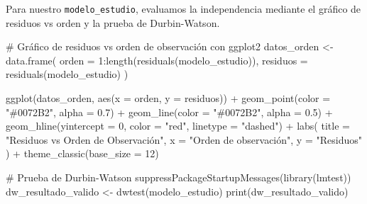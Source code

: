 \documentclass[
  letterpaper,
  DIV=11,
  numbers=noendperiod]{scrreprt}
\newenvironment{Shaded}{\begin{snugshade}}{\end{snugshade}}
\newcommand{\AttributeTok}[1]{\textcolor[rgb]{0.40,0.45,0.13}{#1}}
\newcommand{\CommentTok}[1]{\textcolor[rgb]{0.37,0.37,0.37}{#1}}
\newcommand{\DecValTok}[1]{\textcolor[rgb]{0.68,0.00,0.00}{#1}}
\newcommand{\FloatTok}[1]{\textcolor[rgb]{0.68,0.00,0.00}{#1}}
\newcommand{\FunctionTok}[1]{\textcolor[rgb]{0.28,0.35,0.67}{#1}}
\newcommand{\NormalTok}[1]{\textcolor[rgb]{0.00,0.23,0.31}{#1}}
\newcommand{\OtherTok}[1]{\textcolor[rgb]{0.00,0.23,0.31}{#1}}
\newcommand{\SpecialCharTok}[1]{\textcolor[rgb]{0.37,0.37,0.37}{#1}}
\newcommand{\StringTok}[1]{\textcolor[rgb]{0.13,0.47,0.30}{#1}}
\begin{document}
\begin{tcolorbox}[enhanced jigsaw, leftrule=.75mm, breakable, colbacktitle=quarto-callout-tip-color!10!white, bottomrule=.15mm, colframe=quarto-callout-tip-color-frame, toprule=.15mm, colback=white, coltitle=black, bottomtitle=1mm, left=2mm, title=\textcolor{quarto-callout-tip-color}{\faLightbulb}\hspace{0.5em}{Ejemplo de independencia válida}, opacityback=0, arc=.35mm, opacitybacktitle=0.6, toptitle=1mm, titlerule=0mm, rightrule=.15mm]

Para nuestro \texttt{modelo\_estudio}, evaluamos la independencia
mediante el gráfico de residuos vs orden y la prueba de Durbin-Watson.

\begin{Shaded}
\begin{Highlighting}[]
\CommentTok{\# Gráfico de residuos vs orden de observación con ggplot2}
\NormalTok{datos\_orden }\OtherTok{\textless{}{-}} \FunctionTok{data.frame}\NormalTok{(}
  \AttributeTok{orden =} \DecValTok{1}\SpecialCharTok{:}\FunctionTok{length}\NormalTok{(}\FunctionTok{residuals}\NormalTok{(modelo\_estudio)),}
  \AttributeTok{residuos =} \FunctionTok{residuals}\NormalTok{(modelo\_estudio)}
\NormalTok{)}

\FunctionTok{ggplot}\NormalTok{(datos\_orden, }\FunctionTok{aes}\NormalTok{(}\AttributeTok{x =}\NormalTok{ orden, }\AttributeTok{y =}\NormalTok{ residuos)) }\SpecialCharTok{+}
  \FunctionTok{geom\_point}\NormalTok{(}\AttributeTok{color =} \StringTok{"\#0072B2"}\NormalTok{, }\AttributeTok{alpha =} \FloatTok{0.7}\NormalTok{) }\SpecialCharTok{+}
  \FunctionTok{geom\_line}\NormalTok{(}\AttributeTok{color =} \StringTok{"\#0072B2"}\NormalTok{, }\AttributeTok{alpha =} \FloatTok{0.5}\NormalTok{) }\SpecialCharTok{+}
  \FunctionTok{geom\_hline}\NormalTok{(}\AttributeTok{yintercept =} \DecValTok{0}\NormalTok{, }\AttributeTok{color =} \StringTok{"red"}\NormalTok{, }\AttributeTok{linetype =} \StringTok{"dashed"}\NormalTok{) }\SpecialCharTok{+}
  \FunctionTok{labs}\NormalTok{(}
    \AttributeTok{title =} \StringTok{"Residuos vs Orden de Observación"}\NormalTok{,}
    \AttributeTok{x =} \StringTok{"Orden de observación"}\NormalTok{,}
    \AttributeTok{y =} \StringTok{"Residuos"}
\NormalTok{  ) }\SpecialCharTok{+}
  \FunctionTok{theme\_classic}\NormalTok{(}\AttributeTok{base\_size =} \DecValTok{12}\NormalTok{)}

\CommentTok{\# Prueba de Durbin{-}Watson}
\FunctionTok{suppressPackageStartupMessages}\NormalTok{(}\FunctionTok{library}\NormalTok{(lmtest))}
\NormalTok{dw\_resultado\_valido }\OtherTok{\textless{}{-}} \FunctionTok{dwtest}\NormalTok{(modelo\_estudio)}
\FunctionTok{print}\NormalTok{(dw\_resultado\_valido)}
\end{Highlighting}
\end{Shaded}


\end{tcolorbox}
\end{document}
